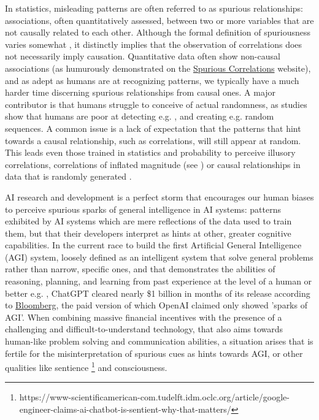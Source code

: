\documentclass{article}
\theoremstyle{plain}
\theoremstyle{definition}
\theoremstyle{remark}
\begin{document}
In statistics, misleading patterns are often referred to as spurious relationships: associations, often quantitatively assessed, between two or more variables that are not causally related to each other. Although the formal definition of spuriousness varies somewhat \cite{haig2003spurious}, it distinctly implies that the observation of correlations does not necessarily imply causation. Quantitative data often show non-causal associations (as humurously demonstrated on the \href{http://www.tylervigen.com/spurious-correlations}{Spurious Correlations} website), and as adept as humans are at recognizing patterns, we typically have a much harder time discerning spurious relationships from causal ones. A major contributor is that humans struggle to conceive of actual randomness, as studies show that humans are poor at detecting e.g. \cite{falk1997making}, and creating e.g. \cite{ladouceur1996erroneous} random sequences. A common issue is a lack of expectation that the patterns that hint towards a causal relationship, such as correlations, will still appear at random. This leads even those trained in statistics and probability to perceive illusory correlations, correlations of inflated magnitude (see \cite{nickerson1998confirmation}) or causal relationships in data that is randomly generated \cite{zgraggen2018investigating}.

AI research and development is a perfect storm that encourages our human biases to perceive spurious sparks of general intelligence in AI systems: patterns exhibited by AI systems which are mere reflections of the data used to train them, but that their developers interpret as hints at other, greater cognitive capabilities. In the current race to build the first Artificial General Intelligence (AGI) system, loosely defined as an intelligent system that solve general problems rather than narrow, specific ones, and that demonstrates the abilities of reasoning, planning, and learning from past experience at the level of a human or better e.g. \cite{bubeck2023sparks}, ChatGPT cleared nearly \$1 billion in months of its release according to \href{https://www.bloomberg.com/news/articles/2023-08-30/openai-nears-1-billion-of-annual-sales-as-chatgpt-takes-off}{Bloomberg}, the paid version of which OpenAI claimed only showed 'sparks of AGI'. When combining massive financial incentives with the presence of a challenging and difficult-to-understand technology, that also aims towards human-like problem solving and communication abilities, a situation arises that is fertile for the misinterpretation of spurious cues as hints towards AGI, or other qualities like sentience \footnote{https://www-scientificamerican-com.tudelft.idm.oclc.org/article/google-engineer-claims-ai-chatbot-is-sentient-why-that-matters/} and consciousness.
\end{document}
